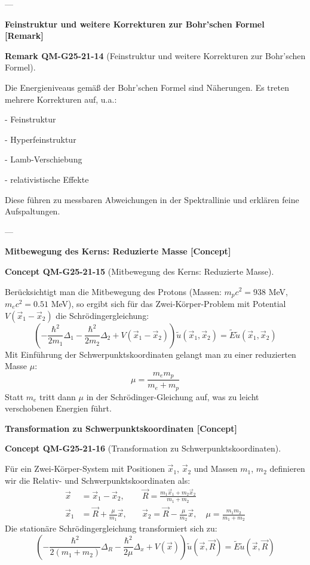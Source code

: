 \documentclass[10pt, letterpaper]{article}
\newcommand{\CustomHeading}[3]{%
  \par\medskip\noindent%
  \textbf{#1 #2} \textnormal{(#3)}.\enskip%
}
\newenvironment{REM}[2]{\begin{unitbox}\CustomHeading{Remark}{#1}{#2}}{\end{unitbox}}
\newenvironment{CONC}[2]{\begin{unitbox}\CustomHeading{Concept}{#1}{#2}}{\end{unitbox}}
\begin{document}
---

\textbf{Feinstruktur und weitere Korrekturen zur Bohr'schen Formel [Remark]}

\begin{REM}{QM-G25-21-14}{Feinstruktur und weitere Korrekturen zur Bohr'schen Formel}
Die Energieniveaus gemäß der Bohr’schen Formel sind Näherungen. Es treten mehrere Korrekturen auf, u.a.:

- Feinstruktur

- Hyperfeinstruktur

- Lamb-Verschiebung

- relativistische Effekte

Diese führen zu messbaren Abweichungen in der Spektrallinie und erklären feine Aufspaltungen.
\end{REM}

---

\textbf{Mitbewegung des Kerns: Reduzierte Masse [Concept]}

\begin{CONC}{QM-G25-21-15}{Mitbewegung des Kerns: Reduzierte Masse}
Berücksichtigt man die Mitbewegung des Protons (Massen: $m_p c^2 = 938$ MeV, $m_e c^2 = 0.51$ MeV), so ergibt sich für das Zwei-Körper-Problem mit Potential $V(\vec{x}_1 - \vec{x}_2)$ die Schrödingergleichung:
\[
\left( -\frac{\hbar^2}{2m_1} \Delta_1 - \frac{\hbar^2}{2m_2} \Delta_2 + V(\vec{x}_1 - \vec{x}_2) \right) \tilde{u}(\vec{x}_1, \vec{x}_2) = \tilde{E} \tilde{u}(\vec{x}_1, \vec{x}_2)
\]
Mit Einführung der Schwerpunktskoordinaten gelangt man zu einer reduzierten Masse $\mu$:
\[
\mu = \frac{m_e m_p}{m_e + m_p}
\]
Statt $m_e$ tritt dann $\mu$ in der Schrödinger-Gleichung auf, was zu leicht verschobenen Energien führt.
\end{CONC}




\textbf{Transformation zu Schwerpunktskoordinaten [Concept]}

\begin{CONC}{QM-G25-21-16}{Transformation zu Schwerpunktskoordinaten}
Für ein Zwei-Körper-System mit Positionen $\vec{x}_1$, $\vec{x}_2$ und Massen $m_1$, $m_2$ definieren wir die Relativ- und Schwerpunktskoordinaten als:
\[
\begin{aligned}
\vec{x} &= \vec{x}_1 - \vec{x}_2, \quad & \vec{R} = \frac{m_1 \vec{x}_1 + m_2 \vec{x}_2}{m_1 + m_2} \\
\vec{x}_1 &= \vec{R} + \frac{\mu}{m_1} \vec{x}, \quad & \vec{x}_2 = \vec{R} - \frac{\mu}{m_2} \vec{x}, \quad \mu = \frac{m_1 m_2}{m_1 + m_2}
\end{aligned}
\]
Die stationäre Schrödingergleichung transformiert sich zu:
\[
\left( -\frac{\hbar^2}{2(m_1 + m_2)} \Delta_R - \frac{\hbar^2}{2\mu} \Delta_x + V(\vec{x}) \right) \tilde{u}(\vec{x}, \vec{R}) = \tilde{E} \tilde{u}(\vec{x}, \vec{R})
\]
\end{CONC}
\end{document}

